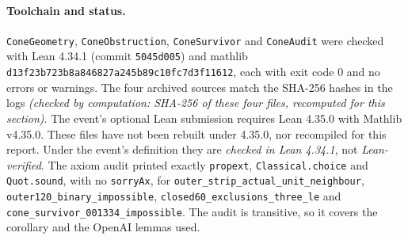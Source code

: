 \documentclass[11pt]{article}
\theoremstyle{definition}
\theoremstyle{remark}
\begin{document}
\paragraph{Toolchain and status.} \texttt{ConeGeometry},
\texttt{ConeObstruction}, \texttt{ConeSurvivor} and \texttt{ConeAudit} were
checked with Lean 4.34.1 (commit \texttt{5045d005}) and mathlib
\texttt{d13f23b723b8a846827a245b89c10fc7d3f11612}, each with exit code $0$
and no errors or warnings. The four archived sources match the SHA-256
hashes in the logs \emph{(checked by computation: SHA-256 of these four
files, recomputed for this section)}.
The event's optional Lean submission requires Lean 4.35.0 with Mathlib
v4.35.0. These files have not been rebuilt under 4.35.0, nor recompiled for
this report. Under the event's definition they are \emph{checked in Lean
4.34.1}, not \emph{Lean-verified}.
The axiom audit printed exactly \texttt{propext}, \texttt{Classical.\allowbreak{}choice}
and \texttt{Quot.sound}, with no \texttt{sorryAx}, for
\texttt{outer\_\allowbreak{}strip\_\allowbreak{}actual\_\allowbreak{}unit\_\allowbreak{}neighbour},
\texttt{outer120\_\allowbreak{}binary\_\allowbreak{}impossible}, \texttt{closed60\_\allowbreak{}exclusions\_\allowbreak{}three\_\allowbreak{}le}
and \texttt{cone\_\allowbreak{}survivor\_\allowbreak{}001334\_\allowbreak{}impossible}. The audit is transitive, so
it covers the corollary and the OpenAI lemmas used.
\end{document}
